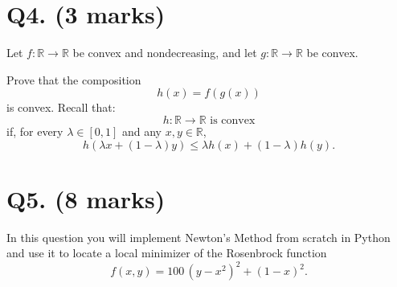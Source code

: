 \documentclass[11pt]{article}
\begin{document}
\section*{Q4. (3 marks)}

Let \(f:\mathbb{R}\rightarrow\mathbb{R}\) be convex and nondecreasing, and let
\(g:\mathbb{R}\rightarrow\mathbb{R}\) be convex.

Prove that the composition
\[
h(x) = f(g(x))
\]
is convex. Recall that:
\[
h:\mathbb{R}\rightarrow\mathbb{R}
\text{ is convex}
\]
if, for every \(\lambda\in[0,1]\) and any \(x,y\in\mathbb{R}\),
\[
h(\lambda x+(1-\lambda)y)
\leq
\lambda h(x)+(1-\lambda)h(y).
\]

\section*{Q5. (8 marks)}  %
In this question you will implement Newton's Method from scratch in Python and use it
to locate a local minimizer of the Rosenbrock function
\[
    f(x,y) = 100\,(y - x^2)^2 + (1 - x)^2.
\]
\end{document}
